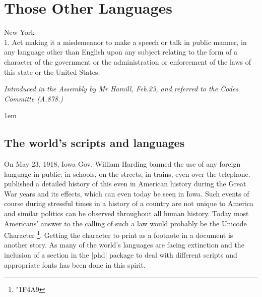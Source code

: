 \newfontfamily{}
\makeatletter
\@specialfalse
\makeatother




\chapter{Those Other Languages}
\label{ch:languages}

\epigraph{New York\\
          1. Act making it a misdemeanor to make a speech or talk in public manner, in any language other
than English upon any subject relating to the form of a character of the government or the administration or enforcement of the laws of this state or the United States. }{\itshape Introduced in the Assembly by Mr Hamill, Feb.23, and referred to the Codes Committe (A.878.)}

\parindent1em



\section{The world's scripts and languages}


On May 23, 1918, Iowa Gov. William Harding banned the use of any foreign language in public: in schools, on the streets, in trains, even over the telephone.   \cite{frese} published a detailed history of this even in American history during the Great War years and its effects, which can even today be seen in Iowa. Such events of course during stressful times in a history of a country are not unique to America and similar politics can be observed throughout all human history. Today most Americans' answer to the calling of such a law would probably be the Unicode Character \footnote{\protect\emoji\protect\char"1F4A9}. Getting the character to print as a footnote in a document is another story. As many of the world's languages are facing extinction and the inclusion of a section in the |phd| package to deal with different scripts and appropriate fonts has been done in this spirit.

